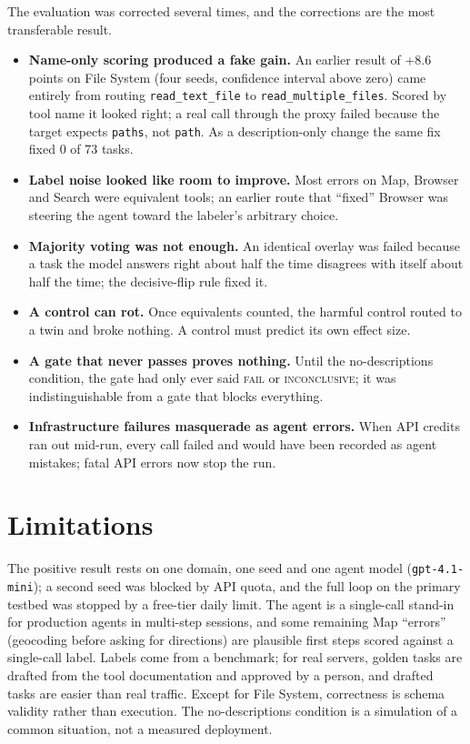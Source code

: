 \documentclass[11pt]{article}
\newcommand{\fail}{\textsc{fail}}
\newcommand{\incon}{\textsc{inconclusive}}
\begin{document}
The evaluation was corrected several times, and the corrections are the most transferable result.
\begin{itemize}
  \item \textbf{Name-only scoring produced a fake gain.} An earlier result of +8.6 points on File System (four seeds, confidence
  interval above zero) came entirely from routing \texttt{read\_text\_file} to \texttt{read\_multiple\_files}. Scored by tool name it
  looked right; a real call through the proxy failed because the target expects \texttt{paths}, not \texttt{path}. As a
  description-only change the same fix fixed 0 of 73 tasks.
  \item \textbf{Label noise looked like room to improve.} Most errors on Map, Browser and Search were equivalent tools; an earlier
  route that ``fixed'' Browser was steering the agent toward the labeler's arbitrary choice.
  \item \textbf{Majority voting was not enough.} An identical overlay was failed because a task the model answers right about half
  the time disagrees with itself about half the time; the decisive-flip rule fixed it.
  \item \textbf{A control can rot.} Once equivalents counted, the harmful control routed to a twin and broke nothing. A control
  must predict its own effect size.
  \item \textbf{A gate that never passes proves nothing.} Until the no-descriptions condition, the gate had only ever said \fail{}
  or \incon; it was indistinguishable from a gate that blocks everything.
  \item \textbf{Infrastructure failures masquerade as agent errors.} When API credits ran out mid-run, every call failed and would
  have been recorded as agent mistakes; fatal API errors now stop the run.
\end{itemize}

\section{Limitations}

The positive result rests on one domain, one seed and one agent model (\texttt{gpt-4.1-mini}); a second seed was blocked by API
quota, and the full loop on the primary testbed was stopped by a free-tier daily limit. The agent is a
single-call stand-in for production agents in multi-step sessions, and some remaining Map ``errors'' (geocoding before asking
for directions) are plausible first steps scored against a single-call label. Labels come from a benchmark; for real servers,
golden tasks are drafted from the tool documentation and approved by a person, and drafted tasks are easier than real traffic.
Except for File System, correctness is schema validity rather than execution. The no-descriptions condition is a simulation of
a common situation, not a measured deployment.
\end{document}
